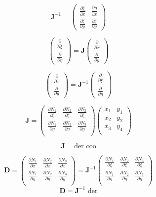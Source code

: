 \documentclass[10pt,a4paper]{book}
\newcommand{\p}{\partial}
\begin{document}
\[
\bm{J}^{-1}=
\begin{pmatrix}
\frac{\p \xi}{\p x}  &  \frac{\p \eta}{\p x}  \\ 
\frac{\p \xi}{\p y} &  \frac{\p \xi}{\p y}  
\end{pmatrix}
\]


\[
\begin{pmatrix}
\frac{\p }{\p \xi} \\
\frac{\p }{\p \eta} 
\end{pmatrix}
= \bm{J} 
\begin{pmatrix}
\frac{\p }{\p x} \\
\frac{\p }{\p y} 
\end{pmatrix}
\]


\[
\begin{pmatrix}
\frac{\p }{\p x} \\
\frac{\p }{\p y} 
\end{pmatrix}
= \bm{J}^{-1} 
\begin{pmatrix}
\frac{\p }{\p \xi} \\
\frac{\p }{\p \eta} 
\end{pmatrix}
\]


\[
\bm{J}=
\begin{pmatrix}
\frac{ \p N_1}{\p \xi}   & \frac{ \p N_2}{\p \xi}  & \frac{ \p N_3}{\p \xi} \\
\frac{ \p N_1}{\p \eta}  & \frac{ \p N_2}{\p \eta}  & \frac{ \p N_3}{\p \eta} \\
\end{pmatrix}
\begin{pmatrix}
x_1   & y_1 \\
x_2   & y_2 \\
x_3   & y_4 \\
\end{pmatrix}
\]

\[
\bm{J}= \text{der  coo}
\]

\[
\bm{D}= 
\begin{pmatrix}
\frac{\p N_1}{\p x} &  \frac{\p N_2}{\p x} &  \frac{\p N_3}{\p x}   \\
\frac{\p N_1}{\p y} &  \frac{\p N_2}{\p y} &  \frac{\p N_3}{\p y}   \\
\end{pmatrix}
=\bm{J}^{-1} 
\begin{pmatrix}
\frac{ \p N_1}{\p \xi}   & \frac{ \p N_2}{\p \xi}  & \frac{ \p N_3}{\p \xi} \\
\frac{ \p N_1}{\p \eta}  & \frac{ \p N_2}{\p \eta}  & \frac{ \p N_3}{\p \eta} \\
\end{pmatrix}
\]
\[
\bm{D} = \bm{J}^{-1} \text{ der}
\]
 
\end{document}
